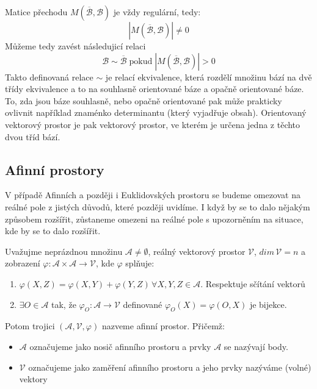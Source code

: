 Matice přechodu $M(\overline{\mathcal{B}}, \mathcal{B})$ je vždy regulární,
tedy:
$$| M(\overline{\mathcal{B}}, \mathcal{B}) | \neq 0$$
Můžeme tedy zavést následujicí relaci
$$\mathcal{B} \sim \overline{\mathcal{B}}\; \text{pokud}\; | M(\overline{\mathcal{B}}, \mathcal{B}) | > 0$$
Takto definovaná relace $\sim$ je relací ekvivalence, která rozdělí množinu bází na dvě třídy
ekvivalence a to na souhlasně orientované báze a opačně orientované báze. To, zda jsou báze souhlasně, nebo
opačně orientované pak může prakticky ovlivnit například znaménko determinantu (který vyjadřuje obsah).
Orientovaný vektorový prostor je pak vektorový prostor, ve kterém je určena jedna z těchto dvou tříd bází.


\subsection{Afinní prostory}
V případě Afinních a později i Euklidovských prostoru se budeme omezovat na reálné pole
z jistých důvodů, které později uvidíme. I když by se to dalo nějakým způsobem rozšířit,
zůstaneme omezeni na reálné pole s upozorněním na situace, kde by se to dalo rozšířit.

\begin{definition}
    Uvažujme neprázdnou množinu $\mathcal{A} \neq \emptyset$,
    reálný vektorový prostor $\mathcal{V}$, $dim\,\mathcal{V} = n$ a zobrazení $\varphi: \mathcal{A}
    \times \mathcal{A} \rightarrow \mathcal{V}$, kde $\varphi$ splňuje:
    \begin{enumerate}[]
        \item $\varphi(X, Z) = \varphi(X, Y) + \varphi(Y, Z)\,\forall X, Y, Z \in \mathcal{A}$.
        \hfill Respektuje sčítání vektorů
        \item $\exists O \in \mathcal{A}$ tak, že
        $\varphi_{O}: \mathcal{A} \rightarrow \mathcal{V}$ definované $\varphi_O(X) = \varphi(O, X)$
        je bijekce. %
    \end{enumerate}

    Potom trojici $(\mathcal{A}, \mathcal{V}, \varphi)$ nazveme afinní prostor.
    Přičemž:
    \begin{itemize}
        \item $\mathcal{A}$ označujeme jako nosič afinního prostoru a prvky $\mathcal{A}$ se
        nazývají body.
        \item $\mathcal{V}$ označujeme jako zaměření afinního prostoru a jeho prvky nazýváme
            (volné) vektory
    \end{itemize}
\end{definition}

